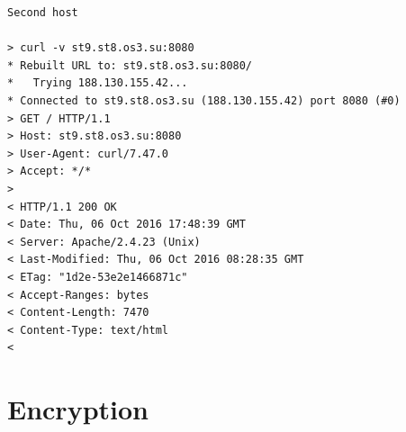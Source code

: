 \documentclass[10pt]{article}
\begin{document}
\begin{enumerate}
\begin{verbatim}
Second host

> curl -v st9.st8.os3.su:8080
* Rebuilt URL to: st9.st8.os3.su:8080/
*   Trying 188.130.155.42...
* Connected to st9.st8.os3.su (188.130.155.42) port 8080 (#0)
> GET / HTTP/1.1
> Host: st9.st8.os3.su:8080
> User-Agent: curl/7.47.0
> Accept: */*
>
< HTTP/1.1 200 OK
< Date: Thu, 06 Oct 2016 17:48:39 GMT
< Server: Apache/2.4.23 (Unix)
< Last-Modified: Thu, 06 Oct 2016 08:28:35 GMT
< ETag: "1d2e-53e2e1466871c"
< Accept-Ranges: bytes
< Content-Length: 7470
< Content-Type: text/html
<
\end{verbatim}
\end{enumerate}

\section{Encryption}
\end{document}
